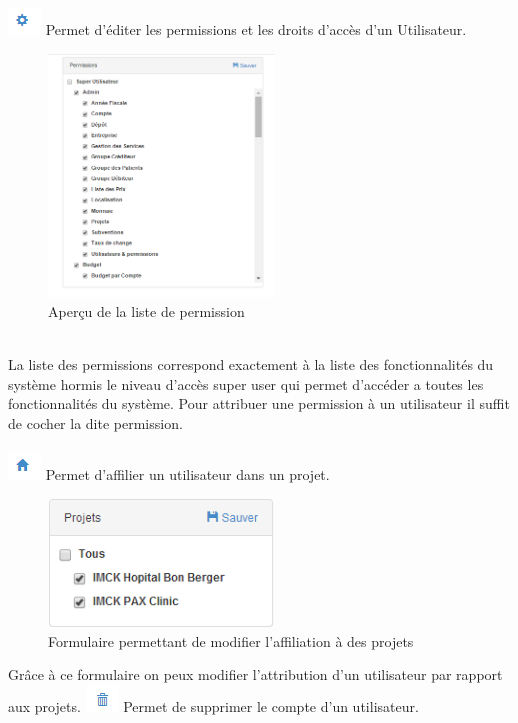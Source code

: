 \documentclass[12pt,a4paper]{report}
\begin{document}
\newpage
 \includegraphics[scale=1]{pic/PermissionUser.png} Permet d'éditer les permissions et les droits d'accès d'un Utilisateur.
 \begin{figure}[h]
\begin{center}
\includegraphics[width=6cm]{pic/ListeDePermission.png}
\end{center}
\caption{Aperçu de la liste de permission}
\label{Aperçu de la liste de permission}
\end{figure}
\\
La liste des permissions correspond exactement à la liste des fonctionnalités du système hormis le niveau d'accès super user qui permet d'accéder a toutes les fonctionnalités du système. Pour attribuer une permission à un utilisateur il suffit de cocher la dite permission.
\\
\\
\includegraphics[scale=1]{pic/Projet.png} Permet d'affilier un utilisateur dans un projet.
\begin{figure}[h]
\begin{center}
\includegraphics[width=6cm]{pic/ListeProjet.png}
\end{center}
\caption{Formulaire permettant de modifier l'affiliation à des projets}
\label{Formulaire permettant de modifier l'affiliation à des projets}
\end{figure}
Grâce à ce formulaire on peux modifier l'attribution d'un utilisateur par rapport aux projets.
\newpage
\includegraphics[scale=1]{pic/DeleteUser.png} Permet de supprimer le compte d'un utilisateur.
\end{document}
